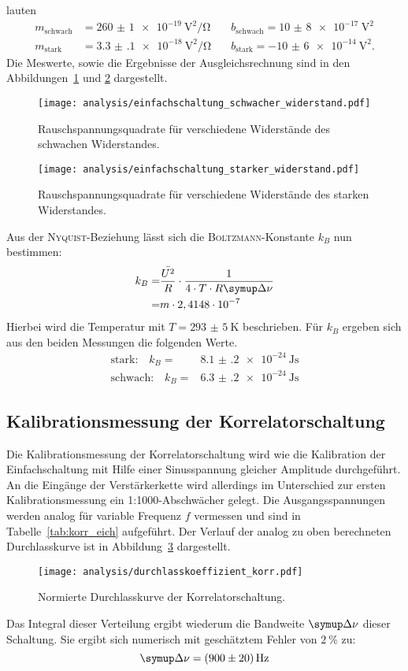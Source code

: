 lauten
%
\begin{align*}
  m_\text{schwach}&=\SI{260(1)e-19}{\volt\squared\per\ohm} \quad &b_\text{schwach}=\SI{10(8)e-17}{\volt\squared} \\ m_\text{stark}&=\SI{3.3(1)e-18}{\volt\squared\per\ohm} \quad &b_\text{stark}=\SI{-10(6)e-14}{\volt\squared}.
\end{align*}
%
Die Meswerte, sowie die Ergebnisse der Ausgleichsrechnung sind in den Abbildungen~\ref{fig:r_schwach} und \ref{fig:r_stark} dargestellt.
%
\begin{figure}
  \centering
  \texttt{[image: analysis/einfachschaltung\_schwacher\_widerstand.pdf]}
  \caption{Rauschspannungsquadrate für verschiedene Widerstände des schwachen Widerstandes.}
  \label{fig:r_schwach}
\end{figure}
%
%
\begin{figure}
  \centering
  \texttt{[image: analysis/einfachschaltung\_starker\_widerstand.pdf]}
  \caption{Rauschspannungsquadrate für verschiedene Widerstände des starken Widerstandes.}
  \label{fig:r_stark}
\end{figure}
%

Aus der \textsc{Nyquist}-Beziehung lässt sich die \textsc{Boltzmann}-Konstante $k_B$ nun bestimmen:
%
\begin{align*}
  k_B=&\frac{\bar{U^2}}{R}\cdot\frac{1}{4\cdot T\cdot R\upD\nu} \\
     =&m\cdot2,4148\cdot10^{-7}
\end{align*}
%
Hierbei wird die Temperatur mit $T=\SI{293(5)}{\kelvin}$ beschrieben. Für $k_{B}$ ergeben sich aus den beiden Messungen die folgenden Werte.
%
\begin{align}
  \text{stark:}\quad k_{B}=&\SI{8.1(2)e-24}{\joule\second} \\
  \text{schwach:}\quad k_{B}=&\SI{6.3(2)e-24}{\joule\second}
\end{align}
%
\subsection{Kalibrationsmessung der Korrelatorschaltung}
%
Die Kalibrationsmessung der Korrelatorschaltung wird wie die Kalibration der Einfachschaltung mit Hilfe einer Sinusspannung gleicher Amplitude durchgeführt. An die Eingänge der Verstärkerkette wird allerdings im Unterschied zur ersten Kalibrationsmessung ein 1:1000-Abschwächer gelegt. Die Ausgangsspannungen werden analog für variable Frequenz $f$ vermessen und sind in Tabelle~\ref{tab:korr_eich} aufgeführt.
Der Verlauf der analog zu oben berechneten Durchlasskurve ist in Abbildung~\ref{fig:korr_beta} dargestellt.
%
\begin{figure}
  \centering
  \texttt{[image: analysis/durchlasskoeffizient\_korr.pdf]}
  \caption{Normierte Durchlasskurve der Korrelatorschaltung.}
  \label{fig:korr_beta}
\end{figure}
%
Das Integral dieser Verteilung ergibt wiederum die Bandweite $\upD\nu$ dieser Schaltung. Sie ergibt sich numerisch mit geschätztem Fehler von $\SI{2}{\percent}$ zu:
%
\begin{equation}
  \upD\nu = \SI{900(20)}{\hertz}
\end{equation}
%

